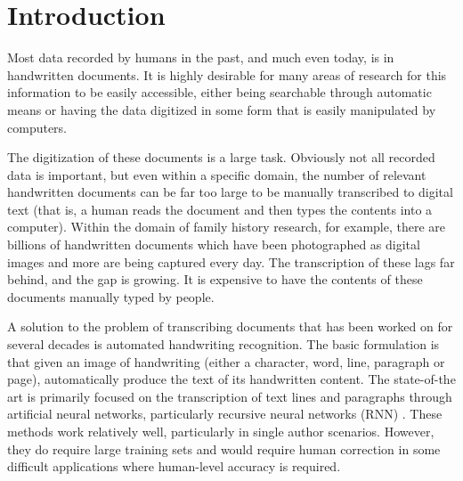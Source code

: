 \documentclass[ms,electronic,twosidetoc,letterpaper,chaptercenter,parttop,lof,lot]{byumsphd}
\title{\Title}
\author{\Author}
\begin{document}
\maketitle
{}

\chapter{Introduction}

Most data recorded by humans in the past, and much even today, is in handwritten documents. 
It is highly desirable for many areas of research for this information to be easily accessible, either being searchable through automatic means or having the data digitized in some form that is easily manipulated by computers.

The digitization of these documents is a large task. Obviously not all recorded data is important, but even within a specific domain, the number of relevant handwritten documents can be far too large to be manually transcribed to digital text (that is, a human reads the document and then types the contents into a computer). Within the domain of family history research, for example, there are billions of handwritten documents which have been photographed as digital images and more are being captured every day.
The transcription of these lags far behind, and the gap is growing. It is expensive to have the contents of these documents manually typed by people.

A solution to the problem of transcribing documents that has been worked on for several decades is automated handwriting recognition. The basic formulation is that given an image of handwriting (either a character, word, line, paragraph or page), automatically produce the text of its handwritten content. The state-of-the art is primarily focused on the transcription of text lines and paragraphs through artificial neural networks, particularly recursive neural networks (RNN) \cite{icfhrComp2016, wigington2017, icdarComp2017}. These methods work relatively well, particularly in single author scenarios. However, they do require large training sets and would require human correction in some difficult applications where human-level accuracy is required.
\end{document}
